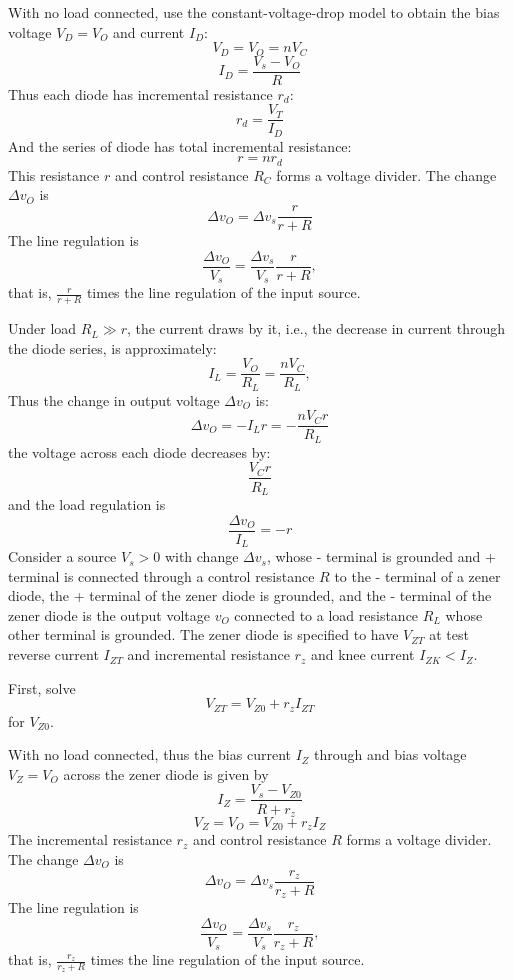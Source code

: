 \documentclass[a4paper,12pt]{report}
\begin{document}
With no load connected, use the constant-voltage-drop model to obtain the bias voltage $V_D=V_O$ and current $I_D$:
\[V_D=V_O=nV_C\]
\[I_D=\frac{V_s-V_O}{R}\]
Thus each diode has incremental resistance $r_d$:
\[r_d=\frac{V_T}{I_D}\]
And the series of diode has total incremental resistance:
\[r=nr_d\]
This resistance $r$ and control resistance $R_C$ forms a voltage divider. The change $\Delta v_O$ is
\[\Delta v_O=\Delta v_s\frac{r}{r+R}\]
The line regulation is
\[\frac{\Delta v_O}{V_s}=\frac{\Delta v_s}{V_s}\frac{r}{r+R},\]
that is, $\frac{r}{r+R}$ times the line regulation of the input source.

Under load $R_L\gg r$, the current draws by it, i.e., the decrease in current through the diode series, is approximately:
\[I_L=\frac{V_O}{R_L}=\frac{nV_C}{R_L},\]
Thus the change in output voltage $\Delta v_O$ is:
\[\Delta v_O=-I_Lr=-\frac{nV_Cr}{R_L}\]
the voltage across each diode decreases by:
\[\frac{V_Cr}{R_L}\]
and the load regulation is
\[\frac{\Delta v_O}{I_L}=-r\]
Consider a source $V_s>0$ with change $\Delta v_s$, whose - terminal is grounded and + terminal is connected through a control resistance $R$ to the - terminal of a zener diode, the + terminal of the zener diode is grounded, and the - terminal of the zener diode is the output voltage $v_O$ connected to a load resistance $R_L$ whose other terminal is grounded. The zener diode is specified to have $V_{ZT}$ at test reverse current $I_{ZT}$ and incremental resistance $r_z$ and knee current $I_{ZK}<I_Z$.

First, solve
\[V_{ZT}=V_{Z0}+r_zI_{ZT}\]
for $V_{Z0}$.

With no load connected, thus the bias current $I_Z$ through and bias voltage $V_Z=V_O$ across the zener diode is given by
\[I_Z=\frac{V_s-V_{Z0}}{R+r_z}\]
\[V_Z=V_O=V_{Z0}+r_zI_Z\]
The incremental resistance $r_z$ and control resistance $R$ forms a voltage divider. The change $\Delta v_O$ is
\[\Delta v_O=\Delta v_s\frac{r_z}{r_z+R}\]
The line regulation is
\[\frac{\Delta v_O}{V_s}=\frac{\Delta v_s}{V_s}\frac{r_z}{r_z+R},\]
that is, $\frac{r_z}{r_z+R}$ times the line regulation of the input source.
\end{document}
